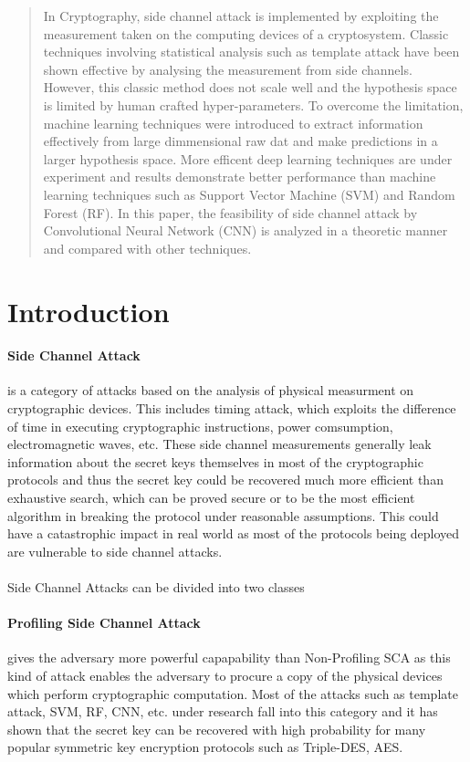 \documentclass[18]{article}
\begin{document}
\maketitle

\begin{abstract}
In Cryptography, side channel attack is implemented by exploiting the measurement taken on the computing devices of a cryptosystem.
Classic techniques involving statistical analysis such as template attack have been shown effective by analysing the measurement from side channels. However, this classic method does not scale well and the hypothesis space is limited by human crafted hyper-parameters. To overcome the limitation, machine learning techniques were introduced to extract information effectively from large dimmensional raw dat and make predictions in a larger hypothesis space. More efficent deep learning techniques are under experiment and results demonstrate better performance than machine learning techniques such as Support Vector Machine (SVM) and Random Forest (RF). In this paper, the feasibility of side channel attack by Convolutional Neural Network (CNN) is analyzed in a theoretic manner and compared with other techniques.
\end{abstract}

\section{Introduction}
\paragraph{Side Channel Attack} is a category of attacks based on the analysis of physical measurment on cryptographic devices. This includes timing attack, which exploits the difference of time in executing cryptographic instructions, power comsumption, electromagnetic waves, etc. These side channel measurements generally leak information about the secret keys themselves in most of the cryptographic protocols and thus the secret key could be recovered much more efficient than exhaustive search, which can be proved secure or to be the most efficient algorithm in breaking the protocol under reasonable assumptions. This could have a catastrophic impact in real world as most of the protocols being deployed are vulnerable to side channel attacks.\\\\
Side Channel Attacks can be divided into two classes
\paragraph{Profiling Side Channel Attack} gives the adversary more powerful capapability than Non-Profiling SCA as this kind of attack enables the adversary to procure a copy of the physical devices which perform cryptographic computation. Most of the attacks such as template attack, SVM, RF, CNN, etc. under research fall into this category and it has shown that the secret key can be recovered with high probability for many popular symmetric key encryption protocols such as Triple-DES, AES.
\end{document}
